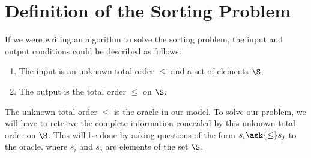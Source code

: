 \section{Definition of the Sorting Problem}
\label{tree:sorting:def}

If we were writing an algorithm to solve the sorting problem, the input and output
conditions could be described as follows:

\begin{enumerate}
\item The input is an unknown total order \(\le\) and a set of elements \(\S\);
\item The output is the total order \(\le\) on \(\S\).
\end{enumerate}

The unknown total order \(\le\) is the oracle in our model. To solve our
problem, we will have to retrieve the complete information concealed by this
unknown total order on \(\S\). This will be done by asking questions of the
form \(s_i \ask{\le} s_j\) to the oracle, where \(s_i\) and \(s_j\) are
elements of the set \(\S\).

